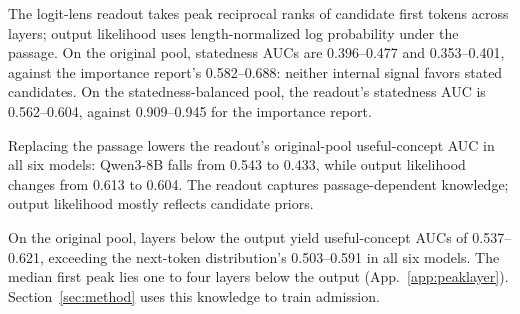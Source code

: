 The logit-lens readout takes peak reciprocal ranks of candidate first tokens across layers; output likelihood uses length-normalized log probability under the passage. On the original pool, statedness AUCs are 0.396--0.477 and 0.353--0.401, against the importance report's 0.582--0.688: neither internal signal favors stated candidates. On the statedness-balanced pool, the readout's statedness AUC is 0.562--0.604, against 0.909--0.945 for the importance report.

Replacing the passage lowers the readout's original-pool useful-concept AUC in all six models: Qwen3-8B falls from 0.543 to 0.433, while output likelihood changes from 0.613 to 0.604. The readout captures passage-dependent knowledge; output likelihood mostly reflects candidate priors.

On the original pool, layers below the output yield useful-concept AUCs of 0.537--0.621, exceeding the next-token distribution's 0.503--0.591 in all six models. The median first peak lies one to four layers below the output (App.~\ref{app:peaklayer}). Section~\ref{sec:method} uses this knowledge to train admission.
